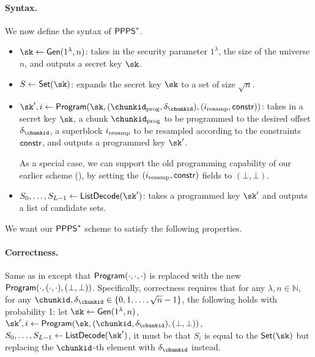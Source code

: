 \paragraph{Syntax.}
We now define the syntax of ${\sf PPPS}^*$.
\begin{itemize}[leftmargin=5mm]
\item 
$\sk \leftarrow {\sf Gen}(1^\lambda, n)$:
takes in the security parameter $1^\lambda$, the size of the universe $n$,
and outputs a secret key $\sk$.
\item  
$S \leftarrow {\sf Set}(\sk)$:
expands the secret key $\sk$ to a set of size $\sqrt{n}$. 
\item 
$\sk', i \leftarrow {\sf Program}(\sk, 
(\chunkid_{\rm prog}, \delta_\chunkid), (i_{\rm resamp}, {\sf constr}))$: 
takes in a secret key $\sk$,  
a chunk $\chunkid_{\rm prog}$ to be programmed to the desired 
offset $\delta_\chunkid$, 
 a superblock $i_{\rm resamp}$ to be resampled
according to the constraints ${\sf constr}$, and outputs
a programmed key $\sk'$. 

As a special case, we can support
the old programming capability of our earlier \ppps scheme
(), by setting the $(i_{\rm resamp}, {\sf constr})$
fields to $(\bot, \bot)$.

\item 
$S_0, \ldots, S_{L-1} \leftarrow {\sf ListDecode}(\sk')$:
takes a programmed key $\sk'$ and outputs a list
of candidate sets. 
\end{itemize}

We want our ${\sf PPPS}^*$ scheme 
to satisfy the following properties.

\paragraph{\bf Correctness.}
Same as in  except
that ${\sf Program}(\cdot, \cdot, \cdot)$
is replaced with the new 
${\sf Program}(\cdot, (\cdot, \cdot), (\bot, \bot))$.
Specifically, 
correctness requires that 
for any $\lambda, n \in \mathbb{N}$, 
for any $\chunkid, \delta_\chunkid \in \{0, 1, \ldots, \sqrt{n}-1\}$, 
the following holds with probability 1:
let 
$\sk \leftarrow {\sf Gen}(1^\lambda, n)$, 
$\sk', i \leftarrow {\sf Program}(\sk, (\chunkid, \delta_\chunkid), (\bot, \bot))$, 
$S_0, \ldots, S_{L-1}
\leftarrow {\sf ListDecode}(\sk')$, 
it must be that 
$S_i$ is equal to the ${\sf Set}(\sk)$ 
but replacing 
the $\chunkid$-th element with 
$\delta_\chunkid$ instead.


